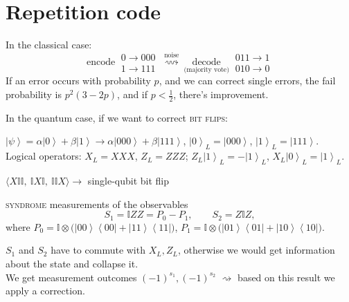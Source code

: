 \documentclass[11pt,a4paper]{article}
\renewcommand{\ket}[1]{\left|#1\right\rangle}
\newcommand{\ketbra}[2]{\left|#1\right\rangle\!\left\langle#2\right|}
\newcommand{\id}{\mathbb{I}}
\begin{document}
\section{Repetition code}

In the classical case:
\[
\text{encode}\ \begin{array}{l}0\to000\\1\to111\end{array}
\ \overset{\text{noise}}{\rightsquigarrow}\
\underset{\text{(majority vote)}}{\text{decode}}\ \begin{array}{l}011\to1\\010\to0\end{array}
\]
If an error occurs with probability $p$, and we can correct single errors, the fail probability is $p^2(3-2p)$, and if $p<\frac12$, there's improvement.

In the quantum case, if we want to correct \textsc{bit flips}:
\begin{description}[leftmargin=!,labelwidth=3.2em]
  \item[enc:] $\ket\psi = \alpha\ket0+\beta\ket1\to\alpha\ket{000}+\beta\ket{111}$, \quad $\ket0_L = \ket{000}$, $\ket1_L = \ket{111}$.\\
  Logical operators: $X_L = XXX$, $Z_L = ZZZ$; \quad $Z_L\ket1_L = -\ket1_L$, $X_L\ket0_L = \ket1_L$.
  \item[noise:] $\langle X\id\id,\ \id X\id,\ \id\id X\rangle\to$ single-qubit bit flip
  \item[dec:] \textsc{syndrome} measurements of the observables
  \[
  S_1 = \id ZZ = P_0 - P_1,\qquad S_2 = Z\id Z,
  \]
  where $P_0 = \id\otimes\bigl(\ketbra{00}{00}+\ketbra{11}{11}\bigr)$, $P_1 = \id\otimes\bigl(\ketbra{01}{01}+\ketbra{10}{10}\bigr)$.
\end{description}
$S_1$ and $S_2$ have to commute with $X_L,Z_L$, otherwise we would get information about the state and collapse it.\\
We get measurement outcomes $(-1)^{s_1},(-1)^{s_2}$ $\rightsquigarrow$ based on this result we apply a correction.
\end{document}

